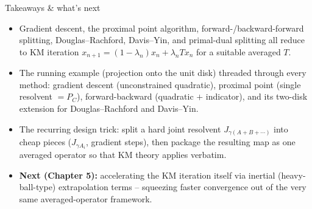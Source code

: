 \documentclass[aspectratio=169,10pt]{beamer}
\begin{document}
\begin{frame}{Takeaways \& what's next}
  \begin{itemize}
    \item Gradient descent, the proximal point algorithm, forward-/backward-forward splitting, Douglas--Rachford, Davis--Yin, and primal-dual splitting all reduce to KM iteration $x_{n+1}=(1-\lambda_n)x_n+\lambda_nTx_n$ for a suitable averaged $T$.
    \item The running example (projection onto the unit disk) threaded through every method: gradient descent (unconstrained quadratic), proximal point (single resolvent $=P_C$), forward-backward (quadratic $+$ indicator), and its two-disk extension for Douglas--Rachford and Davis--Yin.
    \item The recurring design trick: split a hard joint resolvent $J_{\gamma(A+B+\cdots)}$ into cheap pieces ($J_{\gamma A_i}$, gradient steps), then package the resulting map as one averaged operator so that KM theory applies verbatim.
    \item \textbf{Next (Chapter 5):} accelerating the KM iteration itself via inertial (heavy-ball-type) extrapolation terms -- squeezing faster convergence out of the very same averaged-operator framework.
  \end{itemize}
\end{frame}
\end{document}
